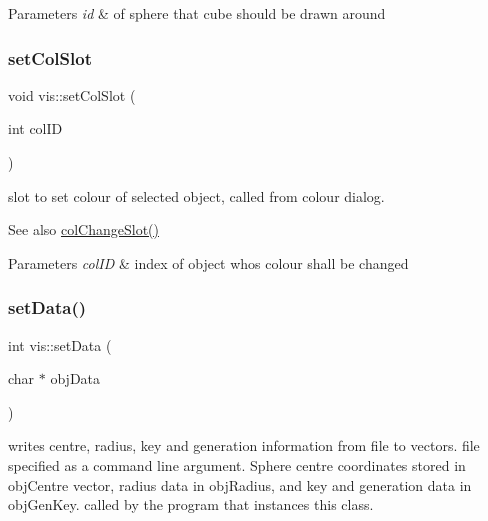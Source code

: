 \begin{DoxyParams}{Parameters}
{\em id} & of sphere that cube should be drawn around \\
\hline
\end{DoxyParams}
\mbox{\label{classvis_a2338a54dfa9091ea6b050b814dc2b679}} 
\subsubsection{\texorpdfstring{set\+Col\+Slot}{setColSlot}}
{\footnotesize\ttfamily void vis\+::set\+Col\+Slot (\begin{DoxyParamCaption}\item[{int}]{col\+ID }\end{DoxyParamCaption})\hspace{0.3cm}{\ttfamily [slot]}}

slot to set colour of selected object, called from colour dialog.

\begin{DoxySeeAlso}{See also}
\mbox{\hyperlink{classvis_ad217326086a9f0cfc1e35df9c7ccf9c0}{col\+Change\+Slot()}} 
\end{DoxySeeAlso}

\begin{DoxyParams}{Parameters}
{\em col\+ID} & index of object whos colour shall be changed \\
\hline
\end{DoxyParams}
\mbox{\label{classvis_adef138ed751afac0d06a8b6d7e206255}} 
\subsubsection{\texorpdfstring{set\+Data()}{setData()}}
{\footnotesize\ttfamily int vis\+::set\+Data (\begin{DoxyParamCaption}\item[{char $\ast$}]{obj\+Data }\end{DoxyParamCaption})}

writes centre, radius, key and generation information from file to vectors. file specified as a command line argument. Sphere centre coordinates stored in obj\+Centre vector, radius data in obj\+Radius, and key and generation data in obj\+Gen\+Key. called by the program that instances this class.


